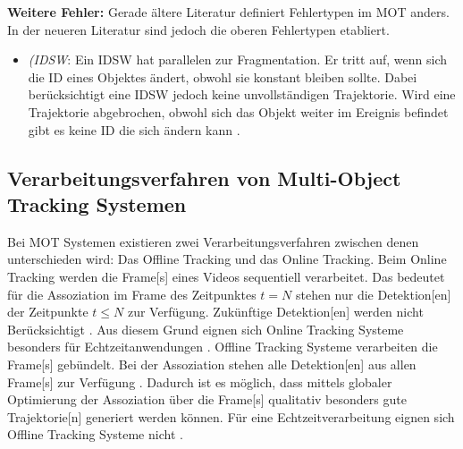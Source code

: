 \textbf{Weitere Fehler:}
Gerade ältere Literatur definiert Fehlertypen im \gls{MOT} anders. In der neueren Literatur sind jedoch die oberen Fehlertypen etabliert.

\begin{itemize}
    \item \textit{(\gls{IDSW}}: Ein \gls{IDSW} hat parallelen zur Fragmentation. Er tritt auf, wenn sich die \gls{ID} eines Objektes ändert, obwohl sie konstant bleiben sollte. Dabei berücksichtigt eine \gls{IDSW} jedoch keine unvollständigen \gls{Trajektorie}. Wird eine \gls{Trajektorie} abgebrochen, obwohl sich das Objekt weiter im \gls{Ereignis} befindet gibt es keine \acrshort{ID} die sich ändern kann \cite{CLEAR.2008, HOTA, IDF1}.
\end{itemize}

\subsection{Verarbeitungsverfahren von Multi-Object Tracking Systemen} \label{sec:MOT Verarbeitungsverfahren}
Bei \gls{MOT} Systemen existieren zwei Verarbeitungsverfahren zwischen denen unterschieden wird: Das \gls{Offline Tracking} und das \gls{Online Tracking}. Beim \gls{Online Tracking} werden die \gls{Frame}[s] eines Videos sequentiell verarbeitet. Das bedeutet für die \gls{Assoziation} im \gls{Frame} des Zeitpunktes \(t=N\) stehen nur die \gls{Detektion}[en] der Zeitpunkte \(t \leq N\)  zur Verfügung. Zukünftige \gls{Detektion}[en] werden nicht Berücksichtigt \cite{Luo.2022}. Aus diesem Grund eignen sich \gls{Online Tracking} Systeme besonders für Echtzeitanwendungen \cite{Bewley.2016}. \gls{Offline Tracking} Systeme verarbeiten die \gls{Frame}[s] gebündelt. Bei der \gls{Assoziation} stehen alle \gls{Detektion}[en] aus allen \gls{Frame}[s] zur Verfügung \cite{Luo.2022}. Dadurch ist es möglich, dass mittels globaler Optimierung der \gls{Assoziation} über die \gls{Frame}[s] qualitativ besonders gute \gls{Trajektorie}[n] generiert werden können. Für eine Echtzeitverarbeitung eignen sich \gls{Offline Tracking} Systeme nicht \cite{Luo.2022}. \par